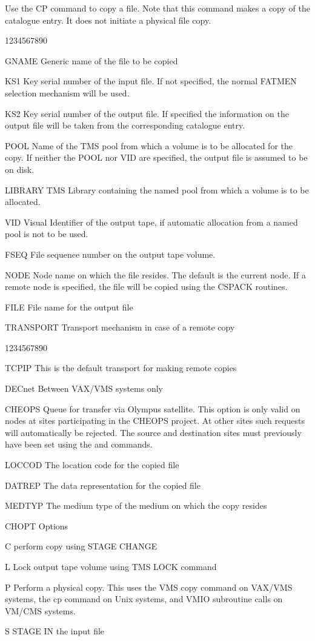 Use the CP command to copy a file. Note that this command makes a copy
of the catalogue entry. It does not initiate a physical file copy.
\begin{DLtt}{1234567890}
\item[GNAME]Generic name of the file to be copied
\item[KS1]Key serial number of the input file. If not specified,
the normal FATMEN selection mechanism will be used.
\item[KS2]Key serial number of the output file. If specified the information
on the output file will be taken from the corresponding catalogue entry.
\item[POOL]Name of the TMS pool from which a volume is to be allocated
for the copy. If neither the POOL nor VID are specified, the output file
is assumed to be on disk.
\item[LIBRARY]TMS Library containing the named pool from which a volume
is to be allocated.     
\item[VID]Visual Identifier of the output tape, if automatic allocation
from a named pool is not to be used.
\item[FSEQ]File sequence number on the output tape volume.
\item[NODE]Node name on which the file resides. The default is the current
node. If a remote node is specified, the file will be copied using the
CSPACK \cite{bib-CSPACK} routines.
\item[FILE]File name for the output file
\item[TRANSPORT]Transport mechanism in case of a remote copy
\begin{DLtt}{1234567890}
\item[TCPIP]This is the default transport for making remote copies
\item[DECnet]Between VAX/VMS systems only
\item[CHEOPS]Queue for transfer via Olympus satellite. This option is
only valid on nodes at sites participating in the CHEOPS project.
At other sites such requests will automatically be rejected.
The source and destination sites must previously have been
set using the  and  commands.
\end{DLtt}
\item[LOCCOD]The location code for the copied file
\item[DATREP]The data representation for the copied file
\item[MEDTYP]The medium type of the medium on which the copy resides
\item[CHOPT]Options
\begin{DLtt}{12}
\item[C]perform copy using STAGE CHANGE
\item[L]Lock output tape volume using TMS LOCK command
\item[P]Perform a physical copy. This uses the VMS copy command
on VAX/VMS systems, the cp command on Unix systems, and VMIO
subroutine calls on VM/CMS systems.
\item[S]STAGE IN the input file
\end{DLtt}
\end{DLtt}
